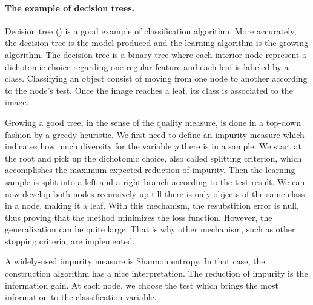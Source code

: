 \documentclass[a4paper]{report}
\newlength{\larg}
\begin{document}
\paragraph{The example of decision trees.}
Decision tree (\cite{decisiontrees}) is a good example of classification algorithm. More accurately, the decision tree is the model produced and the learning algorithm is the growing algorithm. The decision tree is a binary tree where each interior node represent a dichotomic choice regarding one regular feature and each leaf is labeled by a class. Classifying an object consist of moving from one node to another according to the node's test. Once the image reaches a leaf, its class is associated to the image.
\par
Growing a good tree, in the sense of the quality measure, is done in a top-down fashion by a greedy heuristic. We first need to define an impurity measure which indicates how much diversity for the variable $y$ there is in a sample. We start at the root and pick up the dichotomic choice, also called splitting criterion, which accomplishes the maximum expected reduction of impurity. Then the learning sample is split into a left and a right branch according to the test result. We can now develop both nodes recursively up till there is only objects of the same class in a node, making it a leaf. With this mechanism, the resubstition error is null, thus proving that the method minimizes the loss function. However, the generalization can be quite large. That is why other mechanism, such as other stopping criteria, are implemented.
\par
A widely-used impurity measure is Shannon entropy. In that case, the construction algorithm has a nice interpretation. The reduction of impurity is the information gain. At each node, we choose the test which brings the most information to the classification variable.
\end{document}
